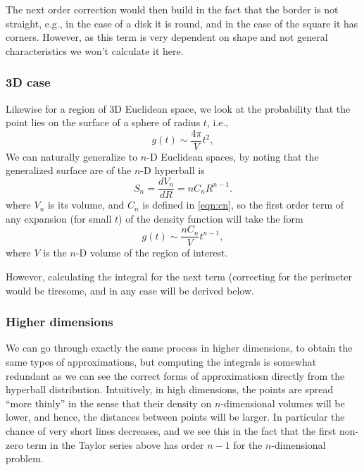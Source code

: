 \documentclass{article}
\begin{document}
The next order correction would then build in the fact that the border
is not straight, e.g., in the case of a disk it is round, and in the
case of the square it has corners. However, as this term is very
dependent on shape and not general characteristics we won't calculate
it here.




\subsubsection{3D case}

Likewise for a region of 3D Euclidean space, we look at the
probability that the point lies on the surface of a sphere of radius
$t$, i.e.,
\begin{equation}
  g(t) \sim \frac{4 \pi}{V} t^2, 
\end{equation}
We can naturally generalize to $n$-D Euclidean spaces, by noting that
the generalized surface are of the $n$-D hyperball is
\begin{equation}
  \label{eq:surface_hyperball}
  S_{n} = \frac{dV_n}{dR} = n C_n R^{n-1}.
\end{equation}
where $V_n$ is its volume, and $C_n$ is defined in \eqref{eqn:cn}, so
the first order term of any expansion (for small $t$) of the density
function will take the form
\begin{equation}
  g(t) \sim \frac{n C_n}{V} t^{n-1}, 
\end{equation}
where $V$ is the $n$-D volume of the region of interest.

However, calculating the integral for the next term (correcting for
the perimeter would be tiresome, and in any case will be derived below.

\subsubsection{Higher dimensions}

We can go through exactly the same process in higher dimensions, to
obtain the same types of approximations, but computing the integrals
is somewhat redundant as we can see the correct forms of
approximatiosn directly from the hyperball distribution. Intuitively,
in high dimensions, the points are spread ``more thinly'' in the sense
that their density on $n$-dimensional volumes will be lower, and
hence, the distances between points will be larger. In particular the
chance of very short lines decreases, and we see this in the fact that
the first non-zero term in the Taylor series above has order $n-1$ for
the $n$-dimensional problem.
\end{document}
